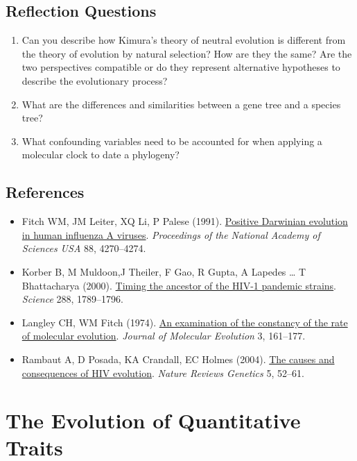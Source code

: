 \documentclass[
]{book}
\providecommand{\tightlist}{%
  \setlength{\itemsep}{0pt}\setlength{\parskip}{0pt}}
\begin{document}
\hypertarget{reflection-questions-6}{%
\section{Reflection Questions}\label{reflection-questions-6}}

\begin{enumerate}
\def\labelenumi{\arabic{enumi}.}
\tightlist
\item
  Can you describe how Kimura's theory of neutral evolution is different from the theory of evolution by natural selection? How are they the same? Are the two perspectives compatible or do they represent alternative hypotheses to describe the evolutionary process?
\item
  What are the differences and similarities between a gene tree and a species tree?
\item
  What confounding variables need to be accounted for when applying a molecular clock to date a phylogeny?
\end{enumerate}

\hypertarget{references-7}{%
\section{References}\label{references-7}}

\begin{itemize}
\tightlist
\item
  Fitch WM, JM Leiter, XQ Li, P Palese (1991). \href{https://www.pnas.org/content/88/10/4270}{Positive Darwinian evolution in human influenza A viruses}. \emph{Proceedings of the National Academy of Sciences USA} 88, 4270--4274.
\item
  Korber B, M Muldoon,J Theiler, F Gao, R Gupta, A Lapedes \ldots{} T Bhattacharya (2000). \href{https://science.sciencemag.org/content/288/5472/1789}{Timing the ancestor of the HIV-1 pandemic strains}. \emph{Science} 288, 1789--1796.
\item
  Langley CH, WM Fitch (1974). \href{https://link.springer.com/article/10.1007/BF01797451}{An examination of the constancy of the rate of molecular evolution}. \emph{Journal of Molecular Evolution} 3, 161--177.
\item
  Rambaut A, D Posada, KA Crandall, EC Holmes (2004). \href{https://www.nature.com/articles/nrg1246}{The causes and consequences of HIV evolution}. \emph{Nature Reviews Genetics} 5, 52--61.
\end{itemize}

\hypertarget{the-evolution-of-quantitative-traits}{%
\chapter{The Evolution of Quantitative Traits}\label{the-evolution-of-quantitative-traits}}
\end{document}
